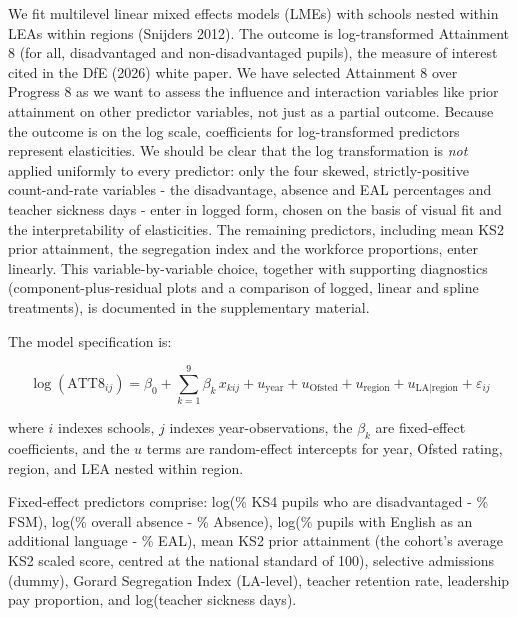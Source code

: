 \documentclass[
  12pt,
  titlepage]{article}
\begin{document}
We fit multilevel linear mixed effects models (LMEs) with schools nested
within LEAs within regions (Snijders 2012). The outcome is
log-transformed Attainment 8 (for all, disadvantaged and
non-disadvantaged pupils), the measure of interest cited in the DfE
(2026) white paper. We have selected Attainment 8 over Progress 8 as we
want to assess the influence and interaction variables like prior
attainment on other predictor variables, not just as a partial outcome.
Because the outcome is on the log scale, coefficients for
log-transformed predictors represent elasticities. We should be clear
that the log transformation is \emph{not} applied uniformly to every
predictor: only the four skewed, strictly-positive count-and-rate
variables - the disadvantage, absence and EAL percentages and teacher
sickness days - enter in logged form, chosen on the basis of visual fit
and the interpretability of elasticities. The remaining predictors,
including mean KS2 prior attainment, the segregation index and the
workforce proportions, enter linearly. This variable-by-variable choice,
together with supporting diagnostics (component-plus-residual plots and
a comparison of logged, linear and spline treatments), is documented in
the supplementary material.

The model specification is:

\[\log(\text{ATT8}_{ij}) = \beta_0 + \sum_{k=1}^{9} \beta_k \, x_{kij} + u_{\text{year}} + u_{\text{Ofsted}} + u_{\text{region}} + u_{\text{LA|region}} + \varepsilon_{ij}
\]

where \(i\) indexes schools, \(j\) indexes year-observations, the
\(\beta_k\) are fixed-effect coefficients, and the \(u\) terms are
random-effect intercepts for year, Ofsted rating, region, and LEA nested
within region.

Fixed-effect predictors comprise: log(\% KS4 pupils who are
disadvantaged - \% FSM), log(\% overall absence - \% Absence), log(\%
pupils with English as an additional language - \% EAL), mean KS2 prior
attainment (the cohort's average KS2 scaled score, centred at the
national standard of 100), selective admissions (dummy), Gorard
Segregation Index (LA-level), teacher retention rate, leadership pay
proportion, and log(teacher sickness days).
\end{document}
